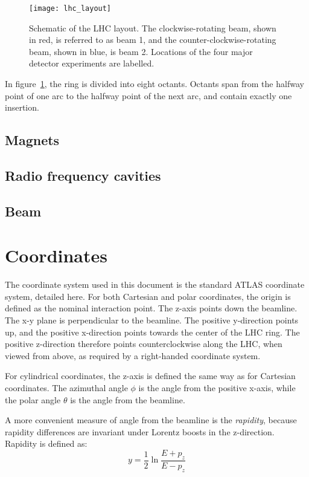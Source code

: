 \begin{figure}[h]
\texttt{[image: lhc\_layout]}
\caption{Schematic of the LHC layout.
The clockwise-rotating beam, shown in red, is referred to as beam 1, and the counter-clockwise-rotating beam, shown in blue, is beam 2.
Locations of the four major detector experiments are labelled.}
\label{fig:lhc_layout}
\end{figure}

In figure~\ref{fig:lhc_layout}, the ring is divided into eight octants.
Octants span from the halfway point of one arc to the halfway point of the next arc,
and contain exactly one insertion.

\subsection{Magnets}\label{subsec:lhc_magnets}

\subsection{Radio frequency cavities}\label{subsec:lhc_rf}

\subsection{Beam}\label{subsec:lhc_beam}


\section{Coordinates}\label{sec:coordinates}
The coordinate system used in this document is the standard ATLAS coordinate system, detailed here.
For both Cartesian and polar coordinates, the origin is defined as the nominal interaction point.
The z-axis points down the beamline.
The x-y plane is perpendicular to the beamline.
The positive y-direction points up, and the positive x-direction points towards the center of the LHC ring.
The positive z-direction therefore points counterclockwise along the LHC, when viewed from above,
as required by a right-handed coordinate system.

For cylindrical coordinates, the z-axis is defined the same way as for
Cartesian coordinates. The azimuthal angle $\phi$ is the angle
from the positive x-axis, while the polar angle $\theta$ is the angle
from the beamline.

A more convenient measure of angle from the beamline is the
\textit{rapidity}, because rapidity differences are invariant under Lorentz boosts in the
z-direction.
Rapidity is defined as:
\begin{equation}
y = \frac{1}{2}\ln\frac{E+p_z}{E-p_z}
\end{equation}

